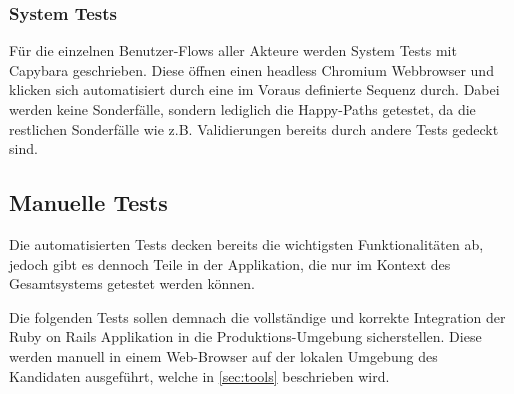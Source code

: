 \subsubsection{System Tests}
Für die einzelnen Benutzer-Flows aller Akteure werden System Tests mit Capybara geschrieben.
Diese öffnen einen headless Chromium Webbrowser und klicken sich automatisiert durch eine im Voraus definierte Sequenz durch.
Dabei werden keine Sonderfälle, sondern lediglich die Happy-Paths getestet, da die restlichen Sonderfälle wie z.B. Validierungen bereits durch andere Tests gedeckt sind.

\newpage

\subsection{Manuelle Tests}

Die automatisierten Tests decken bereits die wichtigsten Funktionalitäten ab,
jedoch gibt es dennoch Teile in der Applikation, die nur im Kontext des Gesamtsystems getestet werden können.

Die folgenden Tests sollen demnach die vollständige und korrekte Integration der Ruby on Rails Applikation in die Produktions-Umgebung sicherstellen.
Diese werden manuell in einem Web-Browser auf der lokalen Umgebung des Kandidaten ausgeführt, welche in \ref{sec:tools} beschrieben wird.

